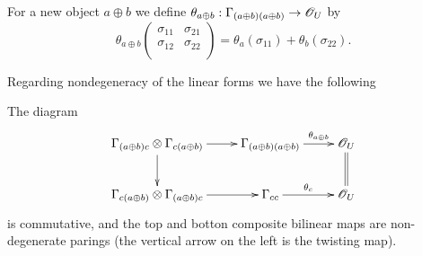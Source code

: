 For a new object $a\oplus b$ we define $\theta_{a\oplus b}:\Gamma_{(a\oplus b)(a\oplus b)}\to \mathscr{O}_U$ by
\begin{equation}\label{linear_form_additive}
\theta_{a\oplus b}\left (\begin{smallmatrix} \sigma_{11} & \sigma_{21} \\ \sigma_{12} & \sigma_{22} \\ \end{smallmatrix} \right )=\theta_{a}(\sigma_{11})+\theta_b(\sigma_{22}).
\end{equation}

Regarding nondegeneracy of the linear forms we have the following

\begin{proposition}\label{nondeg_additive}
The diagram
$$
\xymatrix{
\Gamma_{(a\oplus b)c}\otimes \Gamma_{c(a\oplus b)}\ar[d]\ar[r] & \Gamma_{(a\oplus b)(a\oplus b)}\ar[r]^-{\theta_{a\oplus b}} & \scr{O}_U\ar@{=}[d] \\
\Gamma_{c(a\oplus b)}\otimes \Gamma_{(a\oplus b)c}\ar[r] & \Gamma_{cc} \ar[r]^{\theta_c} & \scr{O}_U}
$$
is commutative, and the top and botton composite bilinear maps are non-degenerate parings (the vertical arrow on the left is the twisting map).
\end{proposition}
